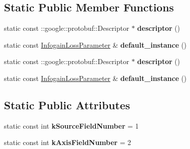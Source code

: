 \subsection*{Static Public Member Functions}
\begin{DoxyCompactItemize}
\item 
\mbox{\label{classcaffe_1_1_infogain_loss_parameter_a7799189faf2c595fd3d2789cf10e8667}} 
static const \+::google\+::protobuf\+::\+Descriptor $\ast$ {\bfseries descriptor} ()
\item 
\mbox{\label{classcaffe_1_1_infogain_loss_parameter_a4e0ba22006a0fc74c68f472688c0a7d0}} 
static const \mbox{\hyperlink{classcaffe_1_1_infogain_loss_parameter}{Infogain\+Loss\+Parameter}} \& {\bfseries default\+\_\+instance} ()
\item 
\mbox{\label{classcaffe_1_1_infogain_loss_parameter_a4ce4efebd331078834c6cccfda3b1b9f}} 
static const \+::google\+::protobuf\+::\+Descriptor $\ast$ {\bfseries descriptor} ()
\item 
\mbox{\label{classcaffe_1_1_infogain_loss_parameter_acb0441118e6ba9f0f473dcd29a436fad}} 
static const \mbox{\hyperlink{classcaffe_1_1_infogain_loss_parameter}{Infogain\+Loss\+Parameter}} \& {\bfseries default\+\_\+instance} ()
\end{DoxyCompactItemize}
\subsection*{Static Public Attributes}
\begin{DoxyCompactItemize}
\item 
\mbox{\label{classcaffe_1_1_infogain_loss_parameter_aea8d2634008b93268b70bca21b5b8c66}} 
static const int {\bfseries k\+Source\+Field\+Number} = 1
\item 
\mbox{\label{classcaffe_1_1_infogain_loss_parameter_a0326e710c80ee26bd48a5912a2a9c1a4}} 
static const int {\bfseries k\+Axis\+Field\+Number} = 2
\end{DoxyCompactItemize}
